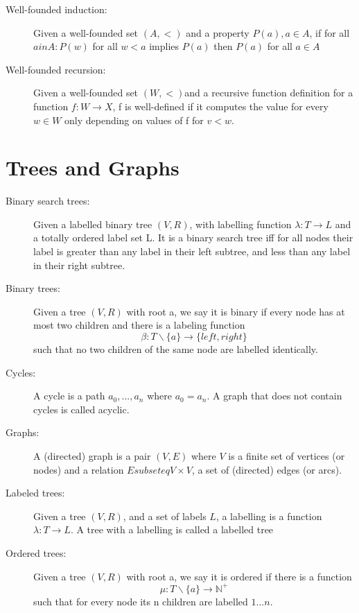 \documentclass[12pt]{article}
\begin{document}
\begin{description}
 \item[Well-founded induction:] Given a well-founded set $(A,<)$ and a property $P(a), a \in A$, if for all $a in A: P(w)$ for all $w < a$ implies $P(a)$ then $P(a)$ for all $a \in A$
\item[Well-founded recursion:] Given a well-founded set $(W,<)$and a recursive function definition for a function $f:W \rightarrow X$, f is well-defined if it computes the value for every $w \in W$ only depending on values of f for $v < w$.
\end{description}

\section{Trees and Graphs}
\begin{description}
\item[Binary search trees:] Given a labelled binary tree  $(V, R)$, with labelling function $\lambda : T \rightarrow L$ and a
totally ordered label set L. It is a binary search tree iff for all nodes their label
is greater than any label in their left subtree, and less than any label in their
right subtree. 

\item[Binary trees:] Given a tree $(V, R)$ with root a, we say it is binary if every node has at most two children and there is a labeling function
\[\beta : T \backslash \{a\} \rightarrow \{left,right\}\]
such that no two children of the same node are labelled identically.

\item[Cycles:] A cycle is a path $a_0 , ... , a_n$ where $a_0 = a_n$. A graph that does not contain cycles is called acyclic.

\item[Graphs:] A (directed) graph is a pair $(V, E)$ where $V$ is a finite set of vertices (or nodes) and a relation $E subseteq V \times V$, a set of (directed) edges (or arcs).

\item[Labeled trees:] Given a tree $(V, R)$, and a set of labels $L$, a labelling is a function $\lambda : T \rightarrow L$. A tree with a labelling is called a labelled tree

\item[Ordered trees:] Given a tree  $(V, R)$ with root a, we say it is ordered if there is a function \[\mu : T \backslash \{a\} \rightarrow \mathbb{N}^{+}\]
such that for every node its n children are labelled $1 ... n$.



\end{description}
\end{document}

